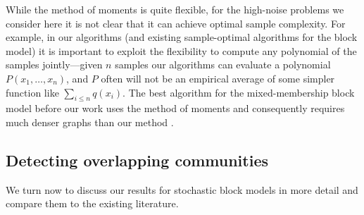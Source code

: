 While the method of moments is quite flexible, for the high-noise problems we consider here it is not clear that it can achieve optimal sample complexity.
For example, in our algorithms (and existing sample-optimal algorithms for the block model) it is important to exploit the flexibility to compute any polynomial of the samples jointly---given $n$ samples our algorithms can evaluate a polynomial $P(x_1,\ldots,x_n)$, and $P$ often will not be an empirical average of some simpler function like $\sum_{i \leq n} q(x_i)$.
The best algorithm for the mixed-membership block model before our work uses the method of moments and consequently requires much denser graphs than our method \cite{DBLP:journals/jmlr/AnandkumarGHK14}.

%
%
%
%
%
%
%

%
%

%

\Dcomment{}

\Dnote{}

\Dcomment{}

\Dcomment{}

\Dcomment{}

\Dcomment{}

%
%


%
%
%
%
%

%


%
%
%
%
%

%
%
%

%

%

%

%

%
%


%
%
%
%
%
%

%
%


%

%

%

%

%

%

%
  
%

%
%


%
%
%
%
%


\subsection{Detecting overlapping communities}
\label{sec:result-block-model}
We turn now to discuss our results for stochastic block models in more detail and compare them to the existing literature.
\Dnote{}

